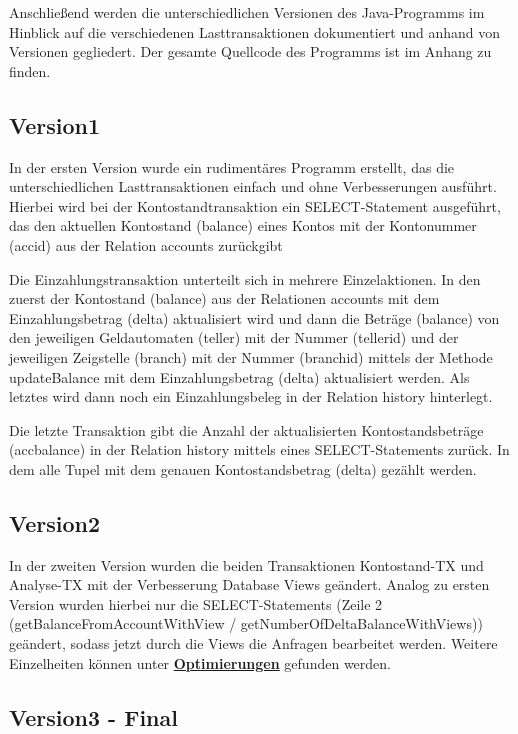 Anschließend werden die unterschiedlichen Versionen des Java-Programms im Hinblick auf die verschiedenen Lasttransaktionen dokumentiert und anhand von Versionen gegliedert.
Der gesamte Quellcode des Programms ist im Anhang zu finden.
\subsection{Version1}\label{subsec:version1}
In der ersten Version wurde ein rudimentäres Programm erstellt, das die unterschiedlichen Lasttransaktionen einfach und ohne Verbesserungen ausführt.
Hierbei wird bei der Kontostandtransaktion ein SELECT-Statement ausgeführt, das den aktuellen Kontostand (balance) eines Kontos mit der Kontonummer (accid) aus der Relation accounts zurückgibt

Die Einzahlungstransaktion unterteilt sich in mehrere Einzelaktionen.
In den zuerst der Kontostand (balance) aus der Relationen accounts mit dem Einzahlungsbetrag (delta) aktualisiert wird und dann die Beträge (balance) von den jeweiligen Geldautomaten (teller) mit der Nummer (tellerid) und der jeweiligen Zeigstelle (branch) mit der Nummer (branchid) mittels der Methode updateBalance mit dem Einzahlungsbetrag (delta) aktualisiert werden.
Als letztes wird dann noch ein Einzahlungsbeleg in der Relation history hinterlegt.

Die letzte Transaktion gibt die Anzahl der aktualisierten Kontostandsbeträge (accbalance) in der Relation history mittels eines SELECT-Statements zurück.
In dem alle Tupel mit dem genauen Kontostandsbetrag (delta) gezählt werden.

\subsection{Version2}\label{subsec:version2}
In der zweiten Version wurden die beiden Transaktionen Kontostand-TX und Analyse-TX mit der Verbesserung Database Views geändert.
Analog zu ersten Version wurden hierbei nur die SELECT-Statements (Zeile 2 (getBalanceFromAccountWithView / getNumberOfDeltaBalanceWithViews)) geändert, sodass jetzt durch die Views die Anfragen bearbeitet werden.
Weitere Einzelheiten können unter \hyperref[sec:optimierungen]{\textbf{Optimierungen}} gefunden werden.



\subsection{Version3 - Final}\label{subsec:version3---final}
